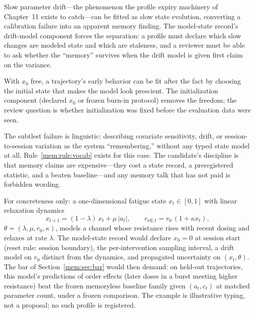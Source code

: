 \begin{threat}\label{mem:threat:drift}
Slow parameter drift---the phenomenon the profile expiry machinery of Chapter~11 exists to catch---can be fitted as slow state evolution, converting a calibration failure into an apparent memory finding. The model-state record's drift-model component forces the separation: a profile must declare which slow changes are modeled state and which are staleness, and a reviewer must be able to ask whether the ``memory'' survives when the drift model is given first claim on the variance.
\end{threat}

\begin{threat}\label{mem:threat:init}
With $x_0$ free, a trajectory's early behavior can be fit after the fact by choosing the initial state that makes the model look prescient. The initialization component (declared $x_0$ or frozen burn-in protocol) removes the freedom; the review question is whether initialization was fixed before the evaluation data were seen.
\end{threat}

\begin{threat}\label{mem:threat:narrative}
The subtlest failure is linguistic: describing covariate sensitivity, drift, or session-to-session variation as the system ``remembering,'' without any typed state model at all. Rule~\ref{mem:rule:vocab} exists for this case. The candidate's discipline is that memory claims are expensive---they cost a state record, a preregistered statistic, and a beaten baseline---and any memory talk that has not paid is forbidden wording.
\end{threat}

\begin{example}\label{mem:ex:minimal}
For concreteness only: a one-dimensional fatigue state $x_t \in [0,1]$ with linear relaxation dynamics
\[
x_{t+1} = (1-\lambda)\,x_t + \mu\,|a_t|, \qquad
r_{\mathrm{eff},t} = r_0\,(1 + \kappa x_t),
\]
$\theta = (\lambda, \mu, r_0, \kappa)$, models a channel whose resistance rises with recent dosing and relaxes at rate $\lambda$. The model-state record would declare $x_0 = 0$ at session start (reset rule: session boundary), the per-intervention sampling interval, a drift model on $r_0$ distinct from the dynamics, and propagated uncertainty on $(x_t, \theta)$. The bar of Section~\ref{mem:sec:bar} would then demand: on held-out trajectories, this model's predictions of order effects (later doses in a burst meeting higher resistance) beat the frozen memoryless baseline family given $(a_t, c_t)$ at matched parameter count, under a frozen comparison. The example is illustrative typing, not a proposal; no such profile is registered.
\end{example}

